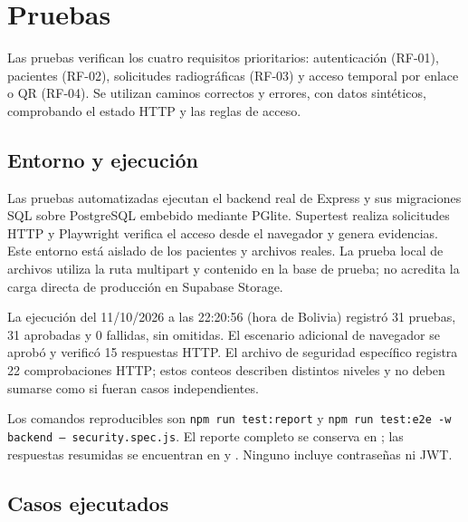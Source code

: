 \section{Pruebas}

Las pruebas verifican los cuatro requisitos prioritarios: autenticación
(RF-01), pacientes (RF-02), solicitudes radiográficas (RF-03) y acceso
temporal por enlace o QR (RF-04). Se utilizan caminos correctos y errores,
con datos sintéticos, comprobando el estado HTTP y las reglas de acceso.

\subsection{Entorno y ejecución}

Las pruebas automatizadas ejecutan el backend real de Express y sus
migraciones SQL sobre PostgreSQL embebido mediante PGlite. Supertest realiza
solicitudes HTTP y Playwright verifica el acceso desde el navegador y genera
evidencias. Este entorno está aislado de los pacientes y archivos reales.
La prueba local de archivos utiliza la ruta multipart y contenido en la base
de prueba; no acredita la carga directa de producción en Supabase Storage.

La ejecución del 11/10/2026 a las 22:20:56 (hora de Bolivia)
registró 31 pruebas, 31 aprobadas y 0 fallidas, sin omitidas.
El escenario adicional de navegador se aprobó y verificó 15
respuestas HTTP. El archivo de seguridad específico registra 22
comprobaciones HTTP; estos conteos describen distintos niveles y no deben sumarse
como si fueran casos independientes.

Los comandos reproducibles son \texttt{npm run test:report} y
\texttt{npm run test:e2e -w backend -- security.spec.js}.
El reporte completo se conserva en
; las respuestas resumidas se encuentran
en  y
. Ninguno incluye contraseñas ni JWT.

\subsection{Casos ejecutados}

